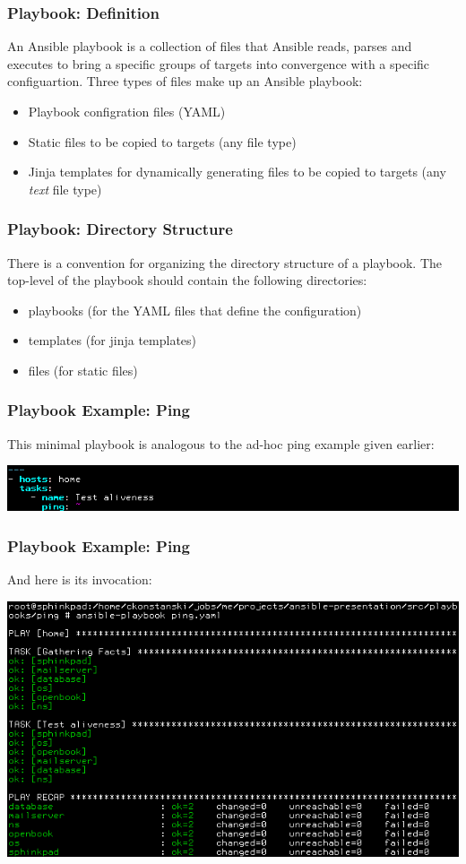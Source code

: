 \documentclass[helvetica,english,utf8,notitle,nologo]{beamer}
\begin{document}
\begin{frame}
  \frametitle{Playbook: Definition}

  An Ansible playbook is a collection of files that Ansible reads,
  parses and executes to bring a specific groups of targets into
  convergence with a specific configuartion. Three types of files make
  up an Ansible playbook:

  \begin{itemize}
  \item Playbook configration files (YAML)
  \item Static files to be copied to targets (any file type)
  \item Jinja templates for dynamically generating files to be copied
    to targets (any \textit{text} file type)
  \end{itemize}
\end{frame}

\begin{frame}
  \frametitle{Playbook: Directory Structure}

  There is a convention for organizing the directory structure of a
  playbook. The top-level of the playbook should contain the following
  directories:

  \begin{itemize}
  \item playbooks (for the YAML files that define the configuration)
  \item templates (for jinja templates)
  \item files (for static files)
  \end{itemize}
\end{frame}

\begin{frame}
  \frametitle{Playbook Example: Ping}

  This minimal playbook is analogous to the ad-hoc ping example given
  earlier:

  \includegraphics[scale=0.44]{img_6}
\end{frame}

\begin{frame}
  \frametitle{Playbook Example: Ping}

  And here is its invocation:

  \includegraphics[scale=0.44]{img_7}
\end{frame}
\end{document}
